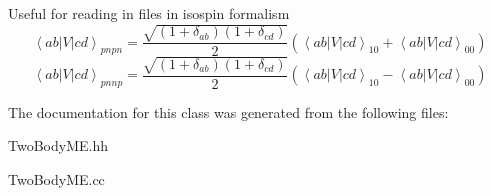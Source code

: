 Useful for reading in files in isospin formalism \[ \left\langle ab | V | cd \right\rangle_{pnpn} = \frac{\sqrt{(1+\delta_{ab})(1+\delta_{cd})}}{2} \left( \left\langle ab | V | cd \right\rangle_{10} + \left\langle ab | V | cd \right\rangle_{00} \right) \] \[ \left\langle ab | V | cd \right\rangle_{pnnp} = \frac{\sqrt{(1+\delta_{ab})(1+\delta_{cd})}}{2} \left( \left\langle ab | V | cd \right\rangle_{10} - \left\langle ab | V | cd \right\rangle_{00} \right) \] 

The documentation for this class was generated from the following files\+:\begin{DoxyCompactItemize}
\item 
Two\+Body\+M\+E.\+hh\item 
Two\+Body\+M\+E.\+cc\end{DoxyCompactItemize}
